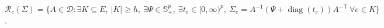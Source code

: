 \(\mathcal R_c(\Sigma)=\{A\in\mathcal D:\exists K\subseteq E,\ |K|\ge h,\ \exists\Psi\in\mathbb S_{+}^p,\ \exists t_e\in[0,\infty)^p,\ \Sigma_e=A^{-1}(\Psi+\operatorname{diag}(t_e))A^{-\mathsf T}\ \forall e\in K\}\).